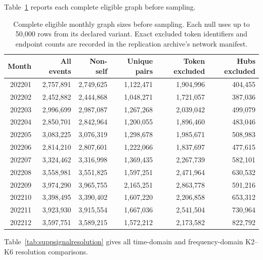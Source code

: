 \documentclass[journal,letterpaper]{IEEEtran}
\begin{document}
Table~\ref{tab:suppgraphcoverage} reports each complete eligible graph before sampling.
\begin{table}[t]
\centering\footnotesize
\caption{Complete eligible monthly graph sizes before sampling. Each null uses up to 50,000 rows from its declared variant. Exact excluded token identifiers and endpoint counts are recorded in the replication archive's network manifest.}
\label{tab:suppgraphcoverage}
\begin{tabular}{rrrrrr}
\toprule
Month & All events & Non-self & Unique pairs & Token excluded & Hubs excluded \\
\midrule
202201 & 2,757,891 & 2,749,625 & 1,122,471 & 1,904,996 & 404,455 \\
202202 & 2,452,882 & 2,444,868 & 1,048,271 & 1,721,057 & 387,036 \\
202203 & 2,996,699 & 2,987,087 & 1,267,268 & 2,039,042 & 499,079 \\
202204 & 2,850,701 & 2,842,964 & 1,200,055 & 1,896,460 & 483,046 \\
202205 & 3,083,225 & 3,076,319 & 1,298,678 & 1,985,671 & 508,983 \\
202206 & 2,814,210 & 2,807,601 & 1,222,066 & 1,837,697 & 477,615 \\
202207 & 3,324,462 & 3,316,998 & 1,369,435 & 2,267,739 & 582,101 \\
202208 & 3,558,981 & 3,551,825 & 1,597,251 & 2,471,964 & 630,532 \\
202209 & 3,974,290 & 3,965,755 & 2,165,251 & 2,863,778 & 591,216 \\
202210 & 3,398,495 & 3,390,402 & 1,607,220 & 2,206,858 & 653,312 \\
202211 & 3,923,930 & 3,915,554 & 1,667,036 & 2,541,504 & 730,964 \\
202212 & 3,597,751 & 3,589,215 & 1,572,212 & 2,173,582 & 822,792 \\
\bottomrule
\end{tabular}
\end{table}
Table~\ref{tab:suppsignalresolution} gives all time-domain and frequency-domain K2--K6 resolution comparisons.
\end{document}
